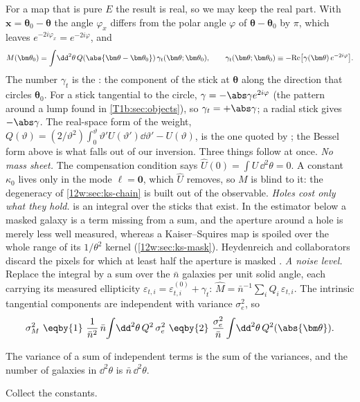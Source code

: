 For a map that is pure $E$ the result is real, so we may keep the real part. With $\bm x=\bm\theta_0-\bm\theta$ the angle
$\varphi_x$ differs from the polar angle $\varphi$ of $\bm\theta-\bm\theta_0$ by $\pi$, which leaves $e^{-2i\varphi_x}=
e^{-2i\varphi}$, and
\begin{equation}
M(\bm\theta_0)=\int\!\dd^2\theta\,Q(\abs{\bm\theta-\bm\theta_0})\,\gamma_t(\bm\theta;\bm\theta_0),
\qquad\gamma_t(\bm\theta;\bm\theta_0)\equiv-\mathrm{Re}\bigl[\gamma(\bm\theta)\,e^{-2i\varphi}\bigr].
\label{12w:eq:map-gt}
\end{equation}
The number $\gamma_t$ is the : the component of the stick at $\bm\theta$ along the direction
that circles $\bm\theta_0$. For a stick tangential to the circle, $\gamma=-\abs\gamma e^{2i\varphi}$ (the pattern
around a lump found in \cref{T1b:sec:objects}), so $\gamma_t=+\abs\gamma$; a radial stick gives $-\abs\gamma$. The
real-space form of the weight, $Q(\vartheta)=(2/\vartheta^2)\int_0^\vartheta\vartheta'U(\vartheta')\dd\vartheta'-
U(\vartheta)$, is the one quoted by \cite[eq.~2]{Heydenreich2021}; the Bessel form above is what falls out of our
inversion. Three things follow at once.
\emph{No mass sheet.} The compensation condition says $\hat U(0)=\int U\,\dd^2\theta=0$. A constant $\kappa_0$ lives
only in the mode $\bm\ell=\bm0$, which $\hat U$ removes, so $M$ is blind to it: the degeneracy of
\cref{12w:sec:ks-chain} is built out of the observable.
\emph{Holes cost only what they hold.}  is an integral over the sticks that exist. In the estimator
below a masked galaxy is a term missing from a sum, and the aperture around a hole is merely less well measured,
whereas a Kaiser--Squires map is spoiled over the whole range of its $1/\theta^2$ kernel
(\cref{12w:sec:ks-mask}). Heydenreich and collaborators discard the pixels for which at least half the aperture is
masked \cite[§2.2]{Heydenreich2021}.
\emph{A noise level.} Replace the integral by a sum over the $\bar n$ galaxies per unit solid angle, each carrying its
measured ellipticity $\varepsilon_{t,i}=\varepsilon^{(0)}_{t,i}+\gamma_t$: $\hat M=\bar n^{-1}\sum_iQ_i\,\varepsilon_{t,i}$.
The intrinsic tangential components are independent with variance $\sigma_e^2$, so
\begin{equation}
\sigma_M^2\ \eqby{1}\ \frac{1}{\bar n^2}\,\bar n\!\int\!\dd^2\theta\,Q^2\,\sigma_e^2
\ \eqby{2}\ \frac{\sigma_e^2}{\bar n}\int\!\dd^2\theta\,Q^2(\abs{\bm\theta}) .
\label{12w:eq:map-noise}
\end{equation}
\begin{explain}
  \item The variance of a sum of independent terms is the sum of the variances, and the number of galaxies in
        $\dd^2\theta$ is $\bar n\,\dd^2\theta$.
  \item Collect the constants.
\end{explain}
